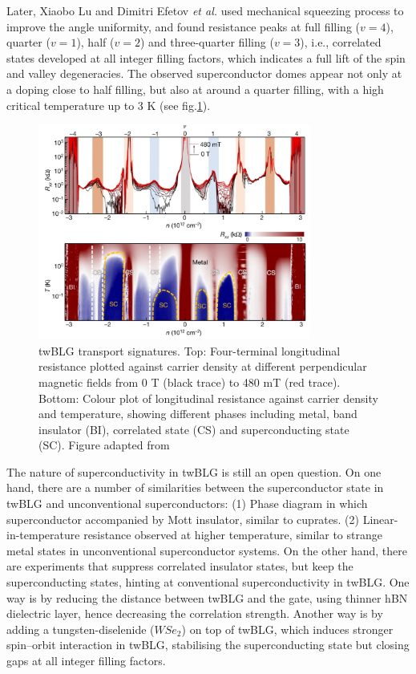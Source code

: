Later, Xiaobo Lu and Dimitri Efetov
\textit{et al.} used mechanical squeezing process to improve the angle uniformity, and found resistance peaks at full filling ($v=4$), quarter ($v=1$), half ($v=2$) and three-quarter filling ($v=3$), i.e., correlated states developed
at all integer filling factors, which indicates a
full lift of the spin and valley degeneracies. \cite{Lu2019} The
observed superconductor domes appear not only at a doping
close to half filling, but also at around a quarter filling, with a
high critical temperature up to 3 K (see fig.\ref{fig:twBLG}).

\begin{figure}[H]
	\centering
	\includegraphics[width=0.8\textwidth]{figures/res_phase.jpg}
	\caption{twBLG transport signatures. Top:  Four-terminal longitudinal resistance plotted against carrier density at different perpendicular magnetic fields from 0 T (black trace) to 480 mT (red trace). Bottom:  Colour plot of longitudinal resistance against carrier density and temperature, showing different phases including metal, band insulator (BI), correlated state (CS) and superconducting state (SC). Figure adapted from \cite{Lu2019}}
	\label{fig:twBLG}
\end{figure}

The nature of superconductivity in twBLG is still an open question. On one hand, there are a number of similarities between the superconductor state in twBLG and unconventional superconductors: (1) Phase diagram in which superconductor accompanied by Mott insulator, \cite{Cao2018_2,Lu2019} similar to cuprates. (2) Linear-in-temperature resistance observed at higher temperature, \cite{Polshyn2019,str} similar to strange metal states in unconventional superconductor systems. On the other hand, there are experiments that suppress correlated insulator states, but keep the superconducting states, hinting at conventional superconductivity in twBLG. One way is by reducing the distance between twBLG and the gate, using thinner hBN dielectric layer, hence decreasing the correlation strength. \cite{Stepanov2020,Saito2020} Another way is by adding a tungsten-diselenide ($WSe_2$) on top of twBLG, which induces stronger spin–orbit interaction in twBLG, stabilising the superconducting state but closing gaps at all integer filling factors. \cite{Arora2020}

